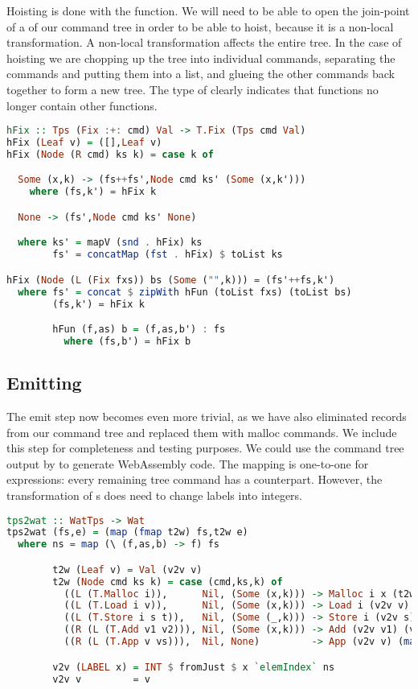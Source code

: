 Hoisting is done with the  function. We will need to be able to open the join-point of a  of our command tree in order to be able to hoist, because it is a non-local transformation. A non-local transformation affects the entire tree. In the case of hoisting we are chopping up the tree into individual commands, separating the  commands and putting them into a list, and glueing the other commands back together to form a new tree. The type of  clearly indicates that functions no longer contain other functions.

\begin{lstlisting}[language=Haskell]
hFix :: Tps (Fix :+: cmd) Val -> T.Fix (Tps cmd Val)
hFix (Leaf v) = ([],Leaf v)
hFix (Node (R cmd) ks k) = case k of

  Some (x,k) -> (fs++fs',Node cmd ks' (Some (x,k')))
    where (fs,k') = hFix k

  None -> (fs',Node cmd ks' None)

  where ks' = mapV (snd . hFix) ks
        fs' = concatMap (fst . hFix) $ toList ks

hFix (Node (L (Fix fxs)) bs (Some ("",k))) = (fs'++fs,k')
  where fs' = concat $ zipWith hFun (toList fxs) (toList bs)
        (fs,k') = hFix k

        hFun (f,as) b = (f,as,b') : fs
          where (fs,b') = hFix b
\end{lstlisting}

\subsection{\label{subsection:emit2}Emitting}
The emit step now becomes even more trivial, as we have also eliminated records from our command tree and replaced them with malloc commands. We include this step for completeness and testing purposes. We could use the command tree output by  to generate WebAssembly code. The mapping is one-to-one for expressions: every remaining tree command has a  counterpart. However, the transformation of s does need to change labels into integers.

\begin{lstlisting}[language=Haskell]
tps2wat :: WatTps -> Wat
tps2wat (fs,e) = (map (fmap t2w) fs,t2w e)
  where ns = map (\ (f,as,b) -> f) fs

        t2w (Leaf v) = Val (v2v v)
        t2w (Node cmd ks k) = case (cmd,ks,k) of
          ((L (T.Malloc i)),      Nil, (Some (x,k))) -> Malloc i x (t2w k)
          ((L (T.Load i v)),      Nil, (Some (x,k))) -> Load i (v2v v) x (t2w k)
          ((L (T.Store i s t)),   Nil, (Some (_,k))) -> Store i (v2v s) (v2v t) (t2w k)
          ((R (L (T.Add v1 v2))), Nil, (Some (x,k))) -> Add (v2v v1) (v2v v2) x (t2w k)
          ((R (L (T.App v vs))),  Nil, None)         -> App (v2v v) (map v2v vs)

        v2v (LABEL x) = INT $ fromJust $ x `elemIndex` ns
        v2v v         = v
\end{lstlisting}

